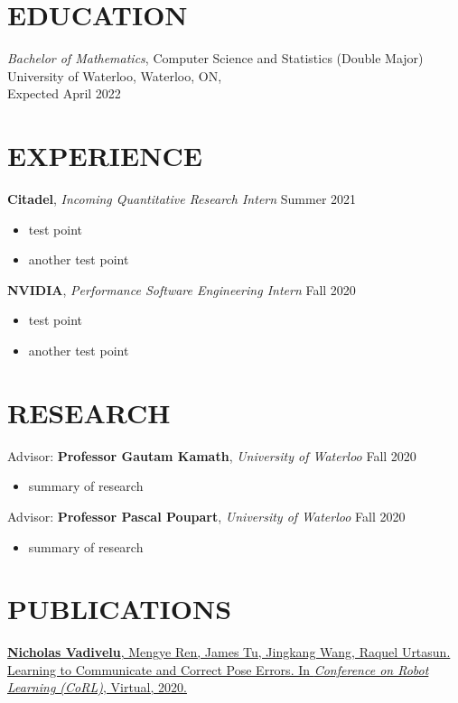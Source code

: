 \documentclass[line,margin]{res}
\newcommand{\experience}[3]{\textbf{#1}, \textit{#2} \hfill #3 \\ \vspace{-4mm}}
\newcommand{\ura}[3]{Advisor: \textbf{#1}, \textit{#2} \hfill #3 \\ \vspace{-4mm}}
\newcommand{\paper}[6]{\href{#6}{#1. #2. In \textit{#3}, #4, #5.}}
\begin{document}
\address{
    (647) 643-4450 $\cdot$
    \href{mailto:nbvadive@uwaterloo.ca}{nbvadive@uwaterloo.ca} $\cdot$
    \href{https://nicholasvadivelu.com/}{nicholasvadivelu.com}
}

\begin{resume}
\vspace{-4mm}

\section{EDUCATION}
    \textit{Bachelor of Mathematics}, Computer Science and Statistics (Double Major) \\
    University of Waterloo, Waterloo, ON, \\
    Expected April 2022


\section{EXPERIENCE}
    \experience{Citadel}{Incoming Quantitative Research Intern}{Summer 2021}
    \begin{itemize}
        \item test point
        \item another test point
    \end{itemize}

    \experience{NVIDIA}{Performance Software Engineering Intern}{Fall 2020}
    \begin{itemize}
        \item test point
        \item another test point
    \end{itemize}


\section{RESEARCH}
    \ura{Professor Gautam Kamath}{University of Waterloo}{Fall 2020}
    \begin{itemize}
        \item summary of research
    \end{itemize}

    \ura{Professor Pascal Poupart}{University of Waterloo}{Fall 2020}
    \begin{itemize}
        \item summary of research
    \end{itemize}

\section{PUBLICATIONS}
    \paper
    {\textbf{Nicholas Vadivelu}, Mengye Ren, James Tu, Jingkang Wang, Raquel Urtasun}
    {Learning to Communicate and Correct Pose Errors}
    {Conference on Robot Learning (CoRL)}{Virtual}{2020}
    {https://arxiv.org/abs/2011.05289}
    \vspace{-3mm}


\end{resume}
\end{document}
